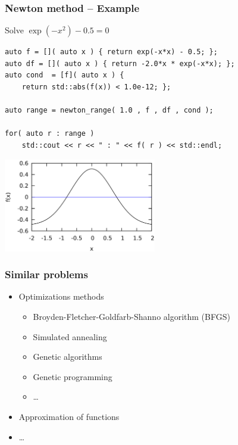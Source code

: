 \documentclass{beamer}
\newcommand{\heading}[1]{\frametitle{#1}}
\begin{document}
\begin{frame}[fragile]
 \heading{Newton method -- Example}
 
 Solve $\exp(-x^2) - 0.5 = 0$
 
 \vspace{1ex}
\begin{lstlisting}[basicstyle=\scriptsize\ttfamily]
auto f = []( auto x ) { return exp(-x*x) - 0.5; };
auto df = []( auto x ) { return -2.0*x * exp(-x*x); };
auto cond  = [f]( auto x ) {
    return std::abs(f(x)) < 1.0e-12; };

auto range = newton_range( 1.0 , f , df , cond );

for( auto r : range )
    std::cout << r << " : " << f( r ) << std::endl;
\end{lstlisting}


 \centerline{ 
\includegraphics[draft=false,width=0.5\textwidth]{newton1}} 

\end{frame}


\begin{frame}[fragile]
 \heading{Similar problems}
 
 \begin{itemize}
  \item Optimizations methods
  \begin{itemize}
    \item Broyden-Fletcher-Goldfarb-Shanno algorithm (BFGS)
    \item Simulated annealing
    \item Genetic algorithms
    \item Genetic programming
    \item \dots
  \end{itemize}
  \item Approximation of functions
  \item \dots
 \end{itemize}

\end{frame}
\end{document}
